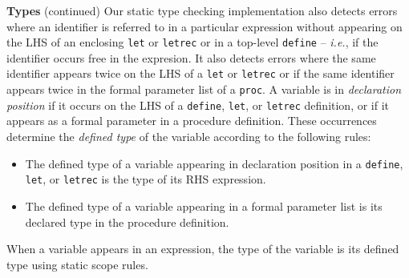 \begin{minipage}[t]{\sw}
\slidenumber
\LARGE
{\bf Types} (continued)\exx
Our static type checking implementation also detects errors
where an identifier is referred to in a particular expression
without appearing on the LHS of an enclosing \verb'let' or \verb'letrec'
or in a top-level \verb'define' --
{\em i.e.}, if the identifier occurs free in the expresion.
It also detects errors where the same identifier appears twice
on the LHS of a \verb'let' or \verb'letrec'
or if the same identifier appears twice
in the formal parameter list of a \verb'proc'.\exx
A variable is in {\em declaration position} if it occurs
on the LHS of a \verb'define', \verb'let', or \verb'letrec' definition,
or if it appears as a formal parameter in a procedure definition.
These occurrences determine the {\em defined type} of the variable
according to the following rules:
\begin{itemize}
\item The defined type of a variable appearing in declaration position
      in a \verb'define', \verb'let', or \verb'letrec'
      is the type of its RHS expression.
\item The defined type of a variable appearing in a formal parameter list
      is its declared type in the procedure definition.
\end{itemize}
When a variable appears in an expression,
the type of the variable
is its defined type using static scope rules.
\end{minipage}
